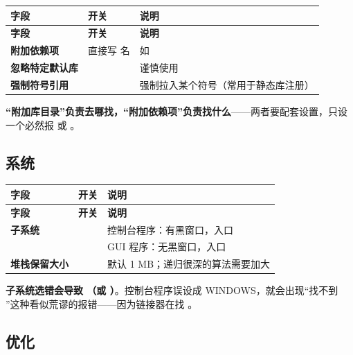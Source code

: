 {{\begin{longtable}{L{3.6cm}L{3.8cm}L{7.0cm}}
\toprule
\textbf{字段} & \textbf{开关} & \textbf{说明} \\
\midrule
\endfirsthead
\toprule
\textbf{字段} & \textbf{开关} & \textbf{说明} \\
\midrule
\endhead
\bottomrule
\endlastfoot
\textbf{附加依赖项} & 直接写  名 & 如  \\
\textbf{忽略特定默认库} &  & 谨慎使用 \\
\textbf{强制符号引用} &  & 强制拉入某个符号（常用于静态库注册） \\
\end{longtable}

\begin{tipbox}[提示]
\textbf{“附加库目录”负责去哪找，“附加依赖项”负责找什么}——两者要配套设置，只设一个必然报  或 。
\end{tipbox}

\subsection{系统}

\begin{longtable}{L{3.8cm}L{5.0cm}L{5.6cm}}
\toprule
\textbf{字段} & \textbf{开关} & \textbf{说明} \\
\midrule
\endfirsthead
\toprule
\textbf{字段} & \textbf{开关} & \textbf{说明} \\
\midrule
\endhead
\bottomrule
\endlastfoot
\textbf{子系统} &  & 控制台程序：有黑窗口，入口  \\
 &  & GUI 程序：无黑窗口，入口  \\
\textbf{堆栈保留大小} &  & 默认 1 MB；递归很深的算法需要加大 \\
\end{longtable}

\begin{warnbox}[注意]
\textbf{子系统选错会导致 （或 ）}。控制台程序误设成 WINDOWS，就会出现“找不到 ”这种看似荒谬的报错——因为链接器在找 。
\end{warnbox}

\subsection{优化}

}}
